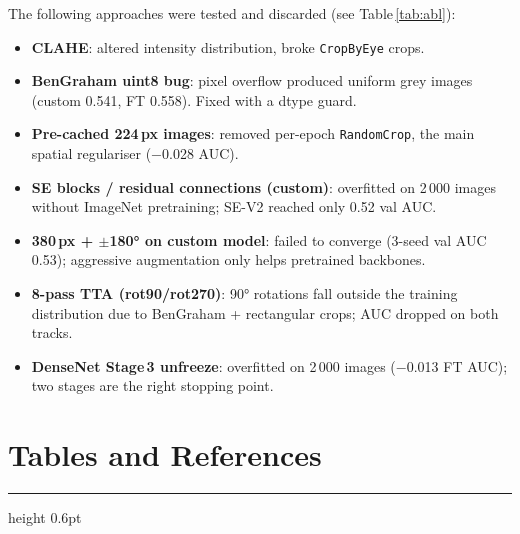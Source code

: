 \documentclass[a4paper, 10pt, twocolumn]{article}
\begin{document}
The following approaches were tested and discarded (see Table\,\ref{tab:abl}):
\begin{itemize}
  \item \textbf{CLAHE}: altered intensity distribution, broke \texttt{CropByEye} crops.
  \item \textbf{BenGraham uint8 bug}: pixel overflow produced uniform grey images (custom 0.541, FT 0.558). Fixed with a dtype guard.
  \item \textbf{Pre-cached 224\,px images}: removed per-epoch \texttt{RandomCrop}, the main spatial regulariser ($-$0.028 AUC).
  \item \textbf{SE blocks / residual connections (custom)}: overfitted on 2\,000 images without ImageNet pretraining; SE-V2 reached only 0.52 val AUC.
  \item \textbf{380\,px + $\pm$180° on custom model}: failed to converge (3-seed val AUC 0.53); aggressive augmentation only helps pretrained backbones.
  \item \textbf{8-pass TTA (rot90/rot270)}: 90° rotations fall outside the training distribution due to BenGraham + rectangular crops; AUC dropped on both tracks.
  \item \textbf{DenseNet Stage\,3 unfreeze}: overfitted on 2\,000 images ($-$0.013 FT AUC); two stages are the right stopping point.
\end{itemize}

\newpage
\onecolumn

\section*{\color{accent}Tables and References}
{\color{rulecolor}\hrule height 0.6pt}
\vspace{4pt}
\end{document}
